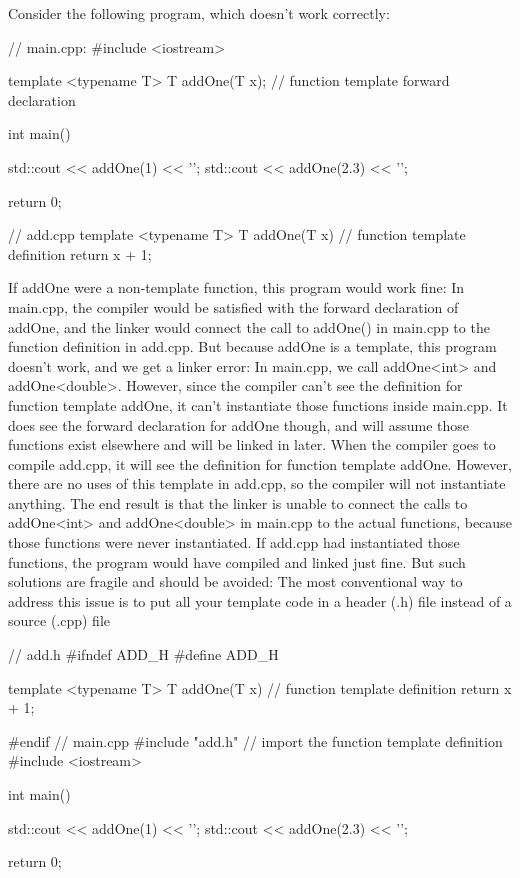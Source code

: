 \documentclass{report}
\begin{document}
\pagebreak 
{}
\bigbreak \noindent 
Consider the following program, which doesn’t work correctly:
\bigbreak \noindent 
\begin{cppcode}
    // main.cpp:
    #include <iostream>

    template <typename T>
    T addOne(T x); // function template forward declaration

    int main() {
        std::cout << addOne(1) << '\n';
        std::cout << addOne(2.3) << '\n';

        return 0;
    }

    // add.cpp
    template <typename T>
    T addOne(T x) // function template definition
    {
        return x + 1;
    }
\end{cppcode}
\bigbreak \noindent 
If addOne were a non-template function, this program would work fine: In main.cpp, the compiler would be satisfied with the forward declaration of addOne, and the linker would connect the call to addOne() in main.cpp to the function definition in add.cpp.
\bigbreak \noindent 
But because addOne is a template, this program doesn’t work, and we get a linker error:
\bigbreak \noindent 
In main.cpp, we call addOne<int> and addOne<double>. However, since the compiler can’t see the definition for function template addOne, it can’t instantiate those functions inside main.cpp. It does see the forward declaration for addOne though, and will assume those functions exist elsewhere and will be linked in later.
\bigbreak \noindent 
When the compiler goes to compile add.cpp, it will see the definition for function template addOne. However, there are no uses of this template in add.cpp, so the compiler will not instantiate anything. The end result is that the linker is unable to connect the calls to addOne<int> and addOne<double> in main.cpp to the actual functions, because those functions were never instantiated.
\bigbreak \noindent 
If add.cpp had instantiated those functions, the program would have compiled and linked just fine. But such solutions are fragile and should be avoided:
\bigbreak \noindent 
The most conventional way to address this issue is to put all your template code in a header (.h) file instead of a source (.cpp) file
\bigbreak \noindent 
\begin{cppcode}
// add.h
#ifndef ADD_H
#define ADD_H

template <typename T>
T addOne(T x) // function template definition
{
    return x + 1;
}

#endif
// main.cpp
#include "add.h" // import the function template definition
#include <iostream>

int main()
{
    std::cout << addOne(1) << '\n';
    std::cout << addOne(2.3) << '\n';

    return 0;
}
\end{cppcode}
\end{document}
